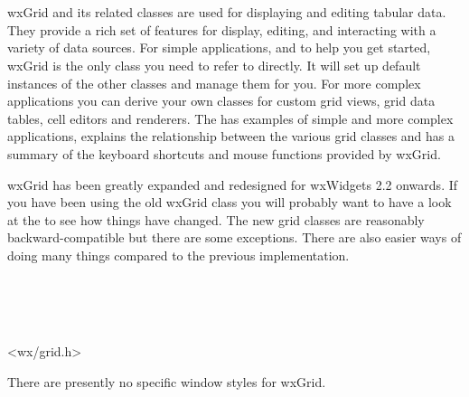 
\section{}\label{wxgrid}

wxGrid and its related classes are used for displaying and editing tabular
data. They provide a rich set of features for display, editing, and
interacting with a variety of data sources. For simple applications, and to
help you get started, wxGrid is the only class you need to refer to
directly. It will set up default instances of the other classes and manage
them for you. For more complex applications you can derive your own
classes for custom grid views, grid data tables, cell editors and
renderers. The  has
examples of simple and more complex applications, explains the
relationship between the various grid classes and has a summary of the
keyboard shortcuts and mouse functions provided by wxGrid.

wxGrid has been greatly expanded and redesigned for wxWidgets 2.2
onwards. If you have been using the old wxGrid class you will probably
want to have a look at the  to see
how things have changed. The new grid classes are reasonably backward-compatible
but there are some exceptions. There are also easier ways of doing many things compared to
the previous implementation.


\\
\\
\\


<wx/grid.h>




There are presently no specific window styles for wxGrid.

